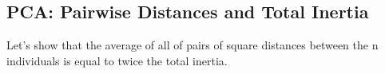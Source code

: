 \begin{notechapter}
\forgetcs\innerproduct\newcommand{\innerproduct}[2]{\langle #1, #2 \rangle}
\forgetcs\mypoint\newcommand{\mypoint}[2]{\tikz[remember picture]{\node[inner sep=0, anchor=base](#1){$#2$};}}
\forgetcs\framedtext\newcommand{\framedtext}[1]{%
\par%
\noindent\fbox{%
    \parbox{\dimexpr\linewidth-2\fboxsep-2\fboxrule}{#1}%
}%
}
\forgetcs\horzbar\newcommand*{\horzbar}{\rule[.5ex]{5.5ex}{0.5pt}}
\forgetcs\vertbar\newcommand*{\vertbar}{\rule[-1ex]{0.5pt}{5.5ex}}
\forgetcs\Tr\newcommand{\Tr}{\operatorname{Tr}}
\chapter{PCA: Pairwise Distances and Total Inertia}\label{ch:pca-inertia}

Let's show that the average of all of pairs of square distances between the n 
individuals is equal to twice the total inertia.
\\


\end{notechapter}
